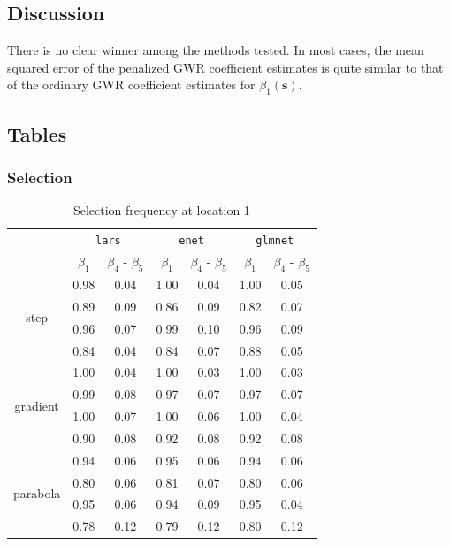 \documentclass[authoryear, review, 11pt]{elsarticle}
\begin{document}
		
	\subsection{Discussion}
	There is no clear winner among the methods tested. In most cases, the mean squared error of the penalized GWR coefficient estimates is quite similar to that of the ordinary GWR coefficient estimates for $\beta_1(\bm{s})$. 
	
	
	\subsection{Tables}
		\subsubsection{Selection}
		\begin{table}[ht]
		\begin{center}
		\begin{tabular}{ccc|cc|cc}
		& \multicolumn{2}{c}{\texttt{lars}} & \multicolumn{2}{c}{\texttt{enet}} & \multicolumn{2}{c}{\texttt{glmnet}} \\
		& $\beta_1$ & $\beta_4$ - $\beta_5$ & $\beta_1$ & $\beta_4$ - $\beta_5$ & $\beta_1$ & $\beta_4$ - $\beta_5$ \\ 
		  \cline{2-7}
		  \multirow{4}{*}{step} & 0.98 & 0.04 & 1.00 & 0.04 & 1.00 & 0.05 \\ 
		  & 0.89 & 0.09 & 0.86 & 0.09 & 0.82 & 0.07 \\ 
		  & 0.96 & 0.07 & 0.99 & 0.10 & 0.96 & 0.09 \\ 
		  & 0.84 & 0.04 & 0.84 & 0.07 & 0.88 & 0.05 \\ 
		  \cline{2-7}
		  \multirow{4}{*}{gradient} & 1.00 & 0.04 & 1.00 & 0.03 & 1.00 & 0.03 \\ 
		  & 0.99 & 0.08 & 0.97 & 0.07 & 0.97 & 0.07 \\ 
		  & 1.00 & 0.07 & 1.00 & 0.06 & 1.00 & 0.04 \\ 
		  & 0.90 & 0.08 & 0.92 & 0.08 & 0.92 & 0.08 \\ 
		  \cline{2-7}
		  \multirow{4}{*}{parabola} & 0.94 & 0.06 & 0.95 & 0.06 & 0.94 & 0.06 \\ 
		  & 0.80 & 0.06 & 0.81 & 0.07 & 0.80 & 0.06 \\ 
		  & 0.95 & 0.06 & 0.94 & 0.09 & 0.95 & 0.04 \\ 
		  & 0.78 & 0.12 & 0.79 & 0.12 & 0.80 & 0.12 \\ 
		  \end{tabular}
		\caption{Selection frequency at location 1\label{table:loc1-selection}}
		\end{center}
		\end{table}
\end{document}
